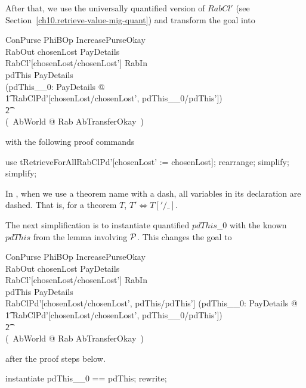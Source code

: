 After that, we use the universally quantified version of $RabCl'$ (see Section~\ref{ch10.retrieve-value-mig-quant})
and transform the goal into
%
\begin{gzed}
    \Delta ConPurse \land PhiBOp \land IncreasePurseOkay \\
    \land RabOut \land chosenLost \in \power PayDetails \\
    \land RabCl'[chosenLost/chosenLost'] \land RabIn \\
    \land pdThis \in PayDetails \land \pdThisPred \\
    \land (\forall pdThis\_\_0: PayDetails @ \\
        \t1 RabClPd'[chosenLost/chosenLost', pdThis\_\_0/pdThis']) \\
\t2 \implies \\
    (~\exists AbWorld @ Rab \land AbTransferOkay~)
\end{gzed}
%
with the following proof commands
%
\begin{gzproof}
    use tRetrieveForAllRabClPd'[chosenLost' := chosenLost];
    rearrange;
    simplify;
    simplify;
\end{gzproof}
%
In \zeves, when we use a theorem name with a dash, all variables in its declaration are dashed.
That is, for a theorem $T$, $T' \iff T['/\_]$.

The next simplification is to instantiate quantified $pdThis\_\_0$ with the known $pdThis$
from the lemma involving $\mathcal{P}$.  This changes the goal to
%
\begin{gzed}
    \Delta ConPurse \land PhiBOp \land IncreasePurseOkay \\
    \land RabOut \land chosenLost \in \power PayDetails \\
    \land RabCl'[chosenLost/chosenLost'] \land RabIn \\
    \land pdThis \in PayDetails \land \pdThisPred \\
    \land RabClPd'[chosenLost/chosenLost', pdThis/pdThis']
    \land (\forall pdThis\_\_0: PayDetails @ \\
        \t1 RabClPd'[chosenLost/chosenLost', pdThis\_\_0/pdThis']) \\
\t2 \implies \\
    (~\exists AbWorld @ Rab \land AbTransferOkay~)
\end{gzed}
%
after the proof steps below.
%
\begin{gzproof}
   instantiate pdThis\_\_0 == pdThis;
   rewrite;
\end{gzproof}

